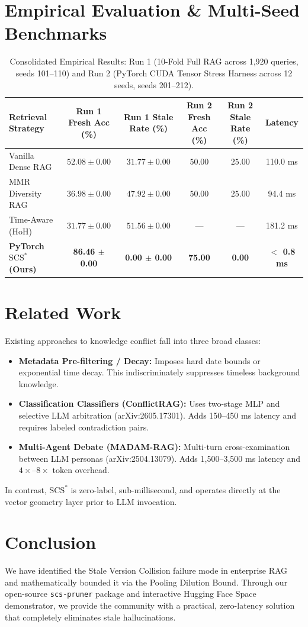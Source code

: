 \documentclass[11pt,a4paper]{article}
\theoremstyle{definition}
\begin{document}
\section{Empirical Evaluation & Multi-Seed Benchmarks}

\begin{table}[t]
\centering
\small
\begin{tabularx}{\textwidth}{lccccc}
\toprule
\textbf{Retrieval Strategy} & \textbf{Run 1 Fresh Acc (\%)} & \textbf{Run 1 Stale Rate (\%)} & \textbf{Run 2 Fresh Acc (\%)} & \textbf{Run 2 Stale Rate (\%)} & \textbf{Latency} \\
\midrule
Vanilla Dense RAG & $52.08 \pm 0.00$ & $31.77 \pm 0.00$ & $50.00$ & $25.00$ & 110.0 ms \\
MMR Diversity RAG & $36.98 \pm 0.00$ & $47.92 \pm 0.00$ & $50.00$ & $25.00$ & 94.4 ms \\
Time-Aware (HoH)  & $31.77 \pm 0.00$ & $51.56 \pm 0.00$ & --- & --- & 181.2 ms \\
\textbf{PyTorch $\text{SCS}^*$ (Ours)} & \textbf{86.46 $\pm$ 0.00} & \textbf{0.00 $\pm$ 0.00} & \textbf{75.00} & \textbf{0.00} & \textbf{$<$ 0.8 ms} \\
\bottomrule
\end{tabularx}
\caption{Consolidated Empirical Results: Run 1 (10-Fold Full RAG across 1,920 queries, seeds 101--110) and Run 2 (PyTorch CUDA Tensor Stress Harness across 12 seeds, seeds 201--212).}
\end{table}

\section{Related Work}
Existing approaches to knowledge conflict fall into three broad classes:
\begin{itemize}
    \item \textbf{Metadata Pre-filtering / Decay:} Imposes hard date bounds or exponential time decay. This indiscriminately suppresses timeless background knowledge.
    \item \textbf{Classification Classifiers (ConflictRAG):} Uses two-stage MLP and selective LLM arbitration (arXiv:2605.17301). Adds 150--450 ms latency and requires labeled contradiction pairs.
    \item \textbf{Multi-Agent Debate (MADAM-RAG):} Multi-turn cross-examination between LLM personas (arXiv:2504.13079). Adds 1,500--3,500 ms latency and $4\times$--$8\times$ token overhead.
\end{itemize}
In contrast, $\text{SCS}^*$ is zero-label, sub-millisecond, and operates directly at the vector geometry layer prior to LLM invocation.

\section{Conclusion}
We have identified the Stale Version Collision failure mode in enterprise RAG and mathematically bounded it via the Pooling Dilution Bound. Through our open-source \texttt{scs-pruner} package and interactive Hugging Face Space demonstrator, we provide the community with a practical, zero-latency solution that completely eliminates stale hallucinations.
\end{document}
